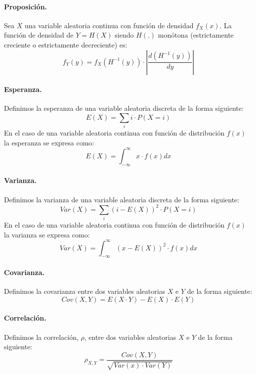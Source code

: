 \paragraph{Proposici\'on.} Sea $X$ una variable aleatoria continua con
funci\'on de densidad $f_X(x)$. La funci\'on de densidad de $Y=H(X)$ siendo 
$H(.)$ mon\'otona (estrictamente creciente o estrictamente decreciente) es:
\begin{displaymath}
f_Y(y) = f_X(H^{-1}(y))\cdot \left| \frac{d(H^{-1}(y))}{dy} \right|
\end{displaymath}

\paragraph{Esperanza.} Definimos la esperanza de una variable aleatoria 
discreta de la forma siguiente:
\begin{displaymath}
E(X) = \sum_{i} i \cdot P(X=i)
\end{displaymath}
En el caso de una variable aleatoria continua con funci\'on de distribuci\'on 
$f(x)$ la esperanza se expresa como:
\begin{displaymath}
E(X) = \int_{-\infty}^{\infty} x \cdot f(x) dx
\end{displaymath}

\paragraph{Varianza.} Definimos la varianza de una variable aleatoria discreta 
de la forma siguiente:
\begin{displaymath}
Var(X) = \sum_{i} (i-E(X))^2 \cdot P(X=i)
\end{displaymath}
En el caso de una variable aleatoria continua con funci\'on de distribuci\'on 
$f(x)$ la varianza se expresa como:
\begin{displaymath}
Var(X) = \int_{-\infty}^{\infty} (x-E(X))^2 \cdot f(x) dx
\end{displaymath}

\paragraph{Covarianza.} Definimos la covarianza entre dos variables 
aleatorias $X$ e $Y$ de la forma siguiente:
\begin{displaymath}
Cov(X,Y) = E(X \cdot Y) - E(X) \cdot E(Y)
\end{displaymath}

\paragraph{Correlaci\'on.} Definimos la correlaci\'on, $\rho$, entre dos 
variables aleatorias $X$ e $Y$ de la forma siguiente:
\begin{displaymath}
\rho_{X,Y} = \frac{Cov(X,Y)}{\sqrt{Var(x) \cdot Var(Y)}}
\end{displaymath}

